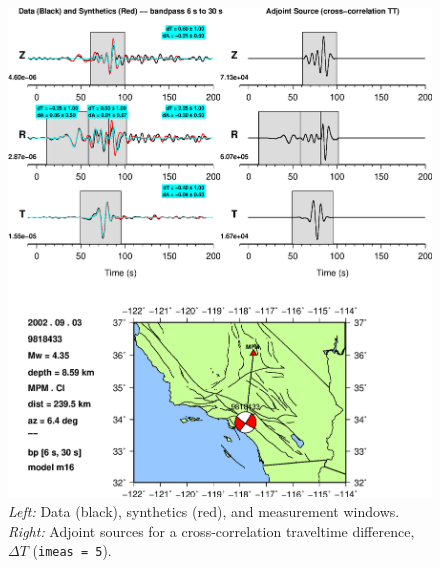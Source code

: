 \documentclass[11pt,titlepage,fleqn]{article}
\begin{document}
\begin{figure}
\includegraphics[width=17cm]{9818433_T006_T030_MPM_CI_m16_iker05_win_adj.eps}
\caption[]
{{
{\em Left:} Data (black), synthetics (red), and measurement windows.
{\em Right:} Adjoint sources for a cross-correlation traveltime difference, $\Delta T$ ({\tt imeas = 5}).
\label{fig:iker05}
}}
\end{figure}
\end{document}
